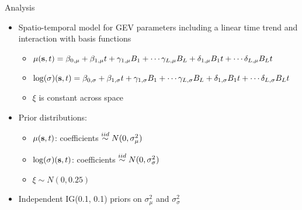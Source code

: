 \documentclass{beamer}
\begin{document}
\begin{frame}{Analysis}
  \begin{itemize} \setlength{\itemsep}{1em}
    \item Spatio-temporal model for GEV parameters including a linear time trend and interaction with basis functions
    \begin{itemize} \setlength{\itemsep}{0.5em}
      \item $\mu(\mbox{\bf s}, t) = \beta_{0, \mu} + \beta_{1, \mu} t + \gamma_{1, \mu} B_1 + \cdots \gamma_{L, \mu} B_L + \delta_{1, \mu} B_1 t + \cdots \delta_{L, \mu} B_L t$
      \item $\log(\sigma) (\mbox{\bf s}, t) = \beta_{0, \sigma} + \beta_{1, \sigma} t + \gamma_{1, \sigma} B_1 + \cdots \gamma_{L, \sigma} B_L + \delta_{1, \sigma} B_1 t + \cdots \delta_{L, \sigma} B_L t$
      \item $\xi$ is constant across space
    \end{itemize}
    \item Prior distributions:
    \begin{itemize} \setlength{\itemsep}{0.5em}
      \item $\mu(\mbox{\bf s}, t)$: coefficients $\stackrel{iid}{\sim} N(0, \sigma^2_\mu)$
      \item $\log(\sigma)(\mbox{\bf s}, t)$: coefficients $\stackrel{iid}{\sim} N(0, \sigma^2_\sigma)$ \vspace{0.5em}
      \item $\xi \sim N(0, 0.25)$
    \end{itemize}
    \item Independent IG(0.1, 0.1) priors on $\sigma^2_\mu$ and $\sigma^2_\sigma$
  \end{itemize}
\end{frame}
\end{document}
